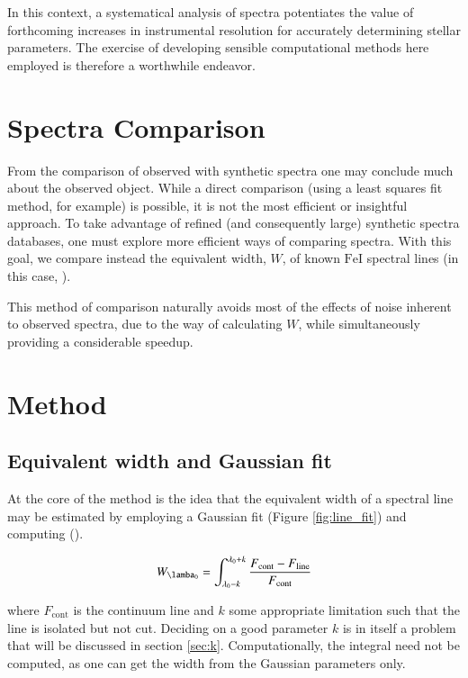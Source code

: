 \documentclass{aa}
\begin{document}
In this context, a systematical analysis of spectra potentiates the value of
forthcoming increases in instrumental resolution for accurately determining
stellar parameters. The exercise of developing sensible computational methods
here employed is therefore a worthwhile endeavor.

\section{Spectra Comparison}

From the comparison of observed with synthetic spectra one may conclude
much about the observed object. While a direct comparison (using a least squares
fit method, for example) is possible, it is not the most efficient or insightful
approach. To take advantage of refined (and consequently large) synthetic spectra
databases, one must explore more efficient ways of comparing spectra. With this
goal, we compare instead the equivalent width, $W$, of known $\mathrm{FeI}$
spectral lines (in this case, \cite{tsantaki_deriving_2013}).

This method of comparison naturally avoids most of the effects of noise inherent to
observed spectra, due to the way of calculating $W$, while simultaneously providing a
considerable speedup.

\section{Method}

\subsection{Equivalent width and Gaussian fit}

At the core of the method is the idea that the equivalent width of a spectral
line may be estimated by employing a Gaussian fit (Figure
\ref{fig:line_fit}) and computing (\cite{monteiro_sebenta_2019}).

\begin{equation}
  \label{eq:W_estimation}
  W_{\lamba_0} = \int_{\lambda_0 - k}^{\lambda_0 + k} \frac{F_{\text{cont}} - F_{\text{line}}}{F_{\text{cont}}}
\end{equation}

where $F_{\text{cont}}$ is the continuum line and $k$ some appropriate
limitation such that the line is isolated but not cut. Deciding on a good
parameter $k$ is in itself a problem that will be discussed in section \ref{sec:k}.
Computationally, the integral need not be computed, as one can get the width from the Gaussian
parameters only.
\end{document}
